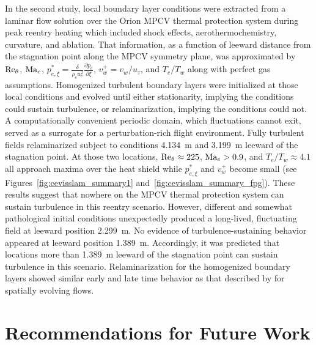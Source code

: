 
In the second study, local boundary layer conditions were extracted from a
laminar flow solution over the Orion MPCV thermal protection system during peak
reentry heating which included shock effects, aerothermochemistry, curvature, and
ablation.  That information, as a function of leeward distance from the
stagnation point along the MPCV symmetry plane, was approximated by
$\Reynolds[\theta]{}$, $\Mach[e]{}$, $p_{e,\xi}^{\ast}=\frac{\delta}{\rho_e
u_e^2}\frac{\partial\!p_e}{\partial\!\xi}$, $v_w^{+} = v_w / u_\tau$, and
$T_e/T_w$ along with perfect gas assumptions.
%
Homogenized turbulent boundary layers were initialized at those local conditions
and evolved until either stationarity, implying the conditions could sustain
turbulence, or relaminarization, implying the conditions could not.
%
A computationally convenient periodic domain, which fluctuations cannot exit,
served as a surrogate for a perturbation-rich flight environment.
%
Fully turbulent fields relaminarized subject to conditions
4.134~m and 3.199~m leeward of the stagnation point.
%
At those two locations, $\Reynolds[\theta]{}\approx{}225$, $\Mach[e]{}>0.9$, and
$T_e/T_w\approx{}4.1$ all approach maxima over the heat shield while
$p_{e,\xi}^\ast$ and $v_w^{+}$ become small (see
Figures~\ref{fig:cevisslam_summary1} and~\ref{fig:cevisslam_summary_fpg}).
%
These results suggest that nowhere on the MPCV thermal protection system can
sustain turbulence in this reentry scenario.
%
However, different and somewhat pathological initial conditions unexpectedly
produced a long-lived, fluctuating field at leeward position 2.299~m.  No
evidence of turbulence-sustaining behavior appeared at leeward position 1.389~m.
Accordingly, it was predicted that locations more than 1.389~m leeward of the
stagnation point can sustain turbulence in this scenario.
%
Relaminarization for the \citet{Topalian2014Spatiotemporal} homogenized boundary
layers showed similar early and late time behavior as that described by
\citet{Cal2008Similarity} for spatially evolving flows.

\section{Recommendations for Future Work}

